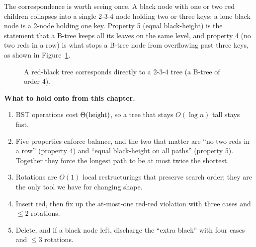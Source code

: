 The correspondence is worth seeing once. A black node with one or two red children
collapses into a single 2-3-4 node holding two or three keys; a lone black node is a
2-node holding one key. Property 5 (equal black-height) is the statement that a
B-tree keeps all its leaves on the same level, and property 4 (no two reds in a row)
is what stops a B-tree node from overflowing past three keys, as shown in Figure~\ref{fig:234-equiv}.

\begin{figure}[htbp]
\centering
{}
\caption{A red-black tree corresponds directly to a 2-3-4 tree (a B-tree of order 4).}
\label{fig:234-equiv}
\end{figure}

\begin{focusbox}
\textbf{What to hold onto from this chapter.}
\begin{enumerate}
\item BST operations cost $\Theta(\text{height})$, so a tree that stays
$O(\log n)$ tall stays fast.
\item Five properties enforce balance, and the two that matter are ``no two reds
in a row'' (property 4) and ``equal black-height on all paths'' (property 5).
Together they force the longest path to be at most twice the shortest.
\item Rotations are $O(1)$ local restructurings that preserve search order;
they are the only tool we have for changing shape.
\item Insert red, then fix up the at-most-one red-red violation with three cases
and $\le 2$ rotations.
\item Delete, and if a black node left, discharge the ``extra black'' with four
cases and $\le 3$ rotations.
\end{enumerate}
\end{focusbox}

